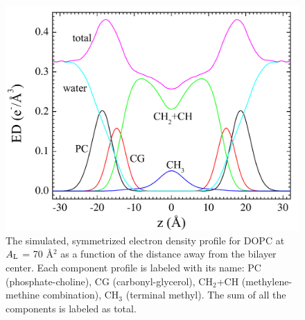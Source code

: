 \begin{figure}[htbp]
  \centering
  \includegraphics[width=1.0\textwidth]{figures/Tat/MD_Results/edp/dopc_70_PC-CG}
  \caption{The simulated, symmetrized electron density profile for DOPC at $A_\textrm{L}$ = 70 \AA$^2$ as 
  a function of the distance away from the bilayer center. 
  Each component profile is labeled with its name: PC (phosphate-choline),
  CG (carbonyl-glycerol), CH$_2$+CH (methylene-methine combination), 
  CH$_3$ (terminal methyl). The sum of all the components is labeled as total.}
  \label{fig:MD_dopc_70_PC-CG}
\end{figure}

